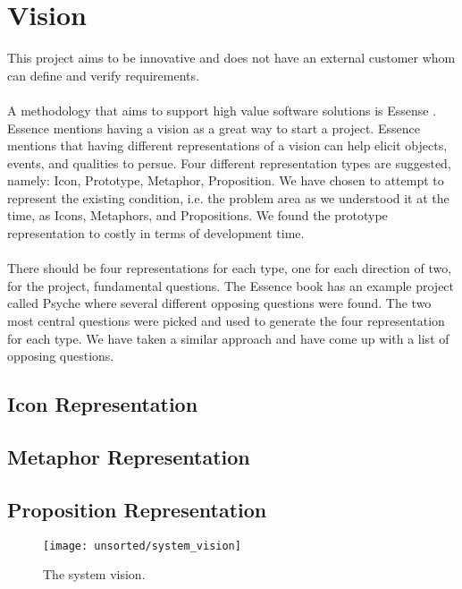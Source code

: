
\section{Vision}
\label{sec:vision}

This project aims to be innovative and does not have an external customer whom can define and verify requirements. 
\\\\
A methodology that aims to support high value software solutions is Essense . Essence mentions having a vision as a great way to start a project. Essence mentions that having different representations of a vision can help elicit objects, events, and qualities to persue. Four different representation types are suggested, namely: Icon, Prototype, Metaphor, Proposition. We have chosen to attempt to represent the existing condition, i.e. the problem area as we understood it at the time, as Icons, Metaphors, and Propositions. We found the prototype representation to costly in terms of development time. 
\\\\
There should be four representations for each type, one for each direction of two, for the project, fundamental questions. The Essence book has an example project called Psyche where several different opposing questions were found. The two most central questions were picked and used to generate the four representation for each type. We have taken a similar approach and have come up with a list of opposing questions. 




\subsection{Icon Representation}


\subsection{Metaphor Representation}


\subsection{Proposition Representation}


\begin{figure}[!htbp]
    \centering
    \texttt{[image: unsorted/system\_vision]}
    \caption{The system vision.}
    \label{fig:system_vision}
\end{figure}
\FloatBarrier
